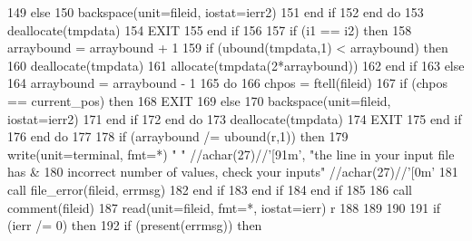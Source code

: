 \begin{DoxyCode}
149                 \textcolor{keywordflow}{else}
150                   backspace(unit=fileid, iostat=ierr2)
151 \textcolor{keywordflow}{                end if}
152 \textcolor{keywordflow}{              end do}
153               \textcolor{keyword}{deallocate}(tmpdata)
154               \textcolor{keywordflow}{EXIT}
155 \textcolor{keywordflow}{            end if}
156             
157             \textcolor{keywordflow}{if} (i1 == i2) \textcolor{keywordflow}{then}
158               arraybound = arraybound + 1
159               \textcolor{keywordflow}{if} (ubound(tmpdata,1) < arraybound) \textcolor{keywordflow}{then}
160                 \textcolor{keyword}{deallocate}(tmpdata)
161                 \textcolor{keyword}{allocate}(tmpdata(2*arraybound))
162 \textcolor{keywordflow}{              end if}    
163             \textcolor{keywordflow}{else} 
164               arraybound = arraybound - 1
165               \textcolor{keywordflow}{do}
166                 chpos = ftell(fileid)
167                 \textcolor{keywordflow}{if} (chpos == current\_pos) \textcolor{keywordflow}{then}
168                   \textcolor{keywordflow}{EXIT}
169                 \textcolor{keywordflow}{else}
170                   backspace(unit=fileid, iostat=ierr2)
171 \textcolor{keywordflow}{                end if}
172 \textcolor{keywordflow}{              end do}
173               \textcolor{keyword}{deallocate}(tmpdata)
174               \textcolor{keywordflow}{EXIT}
175 \textcolor{keywordflow}{            end if}
176 \textcolor{keywordflow}{          end do}
177   
178           \textcolor{keywordflow}{if} (arraybound /= ubound(r,1)) \textcolor{keywordflow}{then}
179             \textcolor{keyword}{write}(unit=terminal, fmt=*) \textcolor{stringliteral}{" "} //achar(27)//\textcolor{stringliteral}{'[91m'}, \textcolor{stringliteral}{"the line in your input file has &}
180 \textcolor{stringliteral}{}\textcolor{stringliteral}{               incorrect number of values, check your inputs"} //achar(27\textcolor{comment}{)//}\textcolor{stringliteral}{'[0m'}
181             \textcolor{keyword}{call }file_error(fileid, errmsg)
182 \textcolor{keywordflow}{         end if}
183 \textcolor{keywordflow}{        end if}
184 \textcolor{keywordflow}{      end if}
185       
186       \textcolor{keyword}{call }comment(fileid)
187       \textcolor{keyword}{read}(unit=fileid, fmt=*, iostat=ierr) r
188     
189       
190       
191       \textcolor{keywordflow}{if} (ierr /= 0) \textcolor{keywordflow}{then}
192         \textcolor{keywordflow}{if} (\textcolor{keyword}{present}(errmsg)) \textcolor{keywordflow}{then}

\end{DoxyCode}
